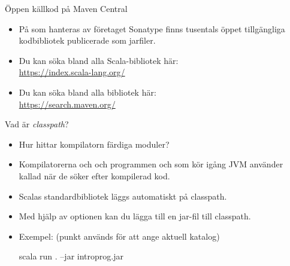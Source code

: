 \begin{Slide}{Öppen källkod på Maven Central}
\begin{itemize}
  \item På  som hanteras av företaget Sonatype finns tusentals öppet tillgängliga kodbibliotek publicerade som jarfiler.
  \item Du kan söka bland alla Scala-bibliotek här: \\\url{https://index.scala-lang.org/}
  \item Du kan söka bland alla bibliotek här: \\\url{https://search.maven.org/}
\end{itemize}
\end{Slide}


\begin{Slide}{Vad är \emph{classpath}?}\SlideFontSmall
\begin{itemize}
  \item Hur hittar kompilatorn färdiga moduler?
\pause
\item Kompilatorerna  och  och programmen  och  som kör igång JVM använder  kallad  när de söker efter kompilerad kod.
\pause
\item Scalas standardbibliotek läggs automatiskt på classpath.
\item Med hjälp av optionen  kan du lägga till en jar-fil till classpath. %
\item Exempel: (punkt används för att ange aktuell katalog)
\begin{REPLnonum}
scala run . --jar introprog.jar
\end{REPLnonum}
\end{itemize}
\end{Slide}


